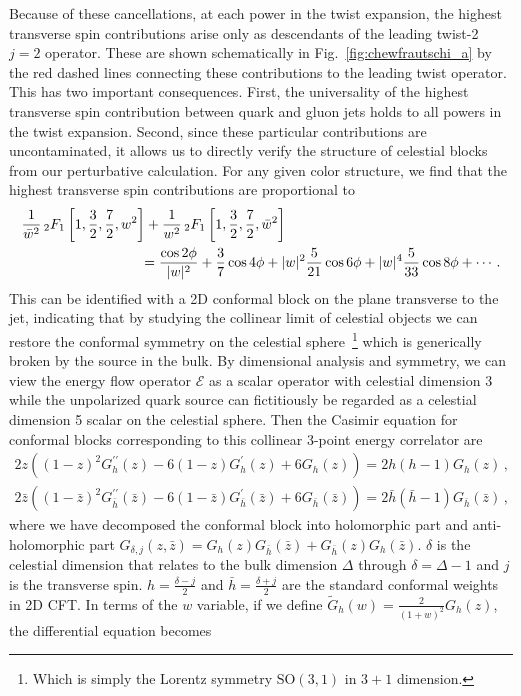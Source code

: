 \documentclass[letterpaper,11pt]{article}
\def\bea{\begin{eqnarray}}
\def\eea{\end{eqnarray}}
\def\nn{{\nonumber}}
\DeclareRobustCommand{\Fig}[1]{Fig.~\ref{#1}}
\begin{document}
Because of these cancellations, at each power in the twist expansion, the highest transverse spin contributions arise only as descendants of the leading twist-2 $j=2$ operator. These are shown schematically in  \Fig{fig:chewfrautschi_a} by the red dashed lines connecting these contributions to the leading twist operator. This has two important consequences. First, the universality of the highest transverse spin contribution between quark and gluon jets holds to all powers in the twist expansion. Second, since these particular contributions are uncontaminated, it allows us to directly verify the structure of celestial blocks from our perturbative calculation.  For any given color structure, we find that the highest transverse spin contributions are proportional to 
\begin{align}
&\frac{1}{\bar{w}^2}\, _2F_1\left[1,  \frac{3}{2},\frac{7}{2},w^2 \right]+\frac{1}{w^2} \, _2F_1\left[1,  \frac{3}{2},\frac{7}{2},\bar w^2\right] \\
&\hspace{3cm}=\frac{\cos 2\phi}{|w|^2}+\frac{3}{7} \cos 4\phi  +|w|^2 \frac{5}{21}\cos6\phi +|w|^4 \frac{5}{33}\cos8\phi  +\cdots\,. \nn
\end{align}
This can be identified with a 2D conformal block on the plane transverse to the jet, indicating that by studying the collinear limit of celestial objects we can restore the conformal symmetry on the celestial sphere~\footnote{Which is simply the Lorentz symmetry $\text{SO}(3,1)$ in $3+1$ dimension.} which is generically broken by the source in the bulk. By dimensional analysis and symmetry, we can view the energy flow operator $\mathcal{E}$ as a scalar operator with celestial dimension 3 while the unpolarized quark source can fictitiously be regarded as a celestial dimension 5 scalar on the celestial sphere. Then the Casimir equation for conformal blocks corresponding to this collinear 3-point energy correlator are \cite{blocks:forthcoming}
\bea
2z\left((1-z)^2G_{h}^{\prime \prime}(z)-6(1-z)G_{h}^{\prime}(z)+6G_{h}(z)\right)=2h(h-1) G_{h}(z)\,,\\
2\bar{z}\left((1-\bar{z})^2G_{\bar{h}}^{\prime \prime}(\bar{z})-6(1-\bar{z})G_{\bar{h}}^{\prime}(\bar{z})+6G_{\bar{h}}(\bar{z})\right)=2\bar{h}(\bar{h}-1) G_{\bar{h}}(\bar{z})\,,
\eea
where we have decomposed the conformal block into holomorphic part and anti-holomorphic part $G_{\delta,j}(z,\bar{z})=G_{h}(z)G_{\bar{h}}(\bar{z})+G_{\bar{h}}(z)G_{h}(\bar{z})$. $\delta$ is the celestial dimension that relates to the bulk dimension $\Delta$ through $\delta=\Delta-1$ and $j$ is the transverse spin. $h=\frac{\delta-j}{2}$ and $\bar{h}=\frac{\delta+j}{2}$ are the standard conformal weights in 2D CFT. In terms of the $w$ variable, if we define $\widetilde{G}_{h}(w)=\frac{2}{(1+w)^2}G_{h}(z)$, the differential equation becomes
\end{document}
